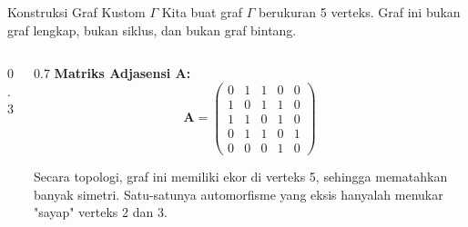 \documentclass[aspectratio=169]{beamer}
\begin{document}
\begin{frame}[fragile]{Konstruksi Graf Kustom $\Gamma$}
  Kita buat graf $\Gamma$ berukuran 5 verteks. Graf ini bukan graf lengkap, bukan siklus, dan bukan graf bintang.

  \begin{columns}
    \begin{column}{0.3\textwidth}
    \end{column}

    \begin{column}{0.7\textwidth}
      \small
      \textbf{Matriks Adjasensi $\mathbf{A}$:}
      $$ \mathbf{A} = \begin{pmatrix}
          0 & 1 & 1 & 0 & 0 \\
          1 & 0 & 1 & 1 & 0 \\
          1 & 1 & 0 & 1 & 0 \\
          0 & 1 & 1 & 0 & 1 \\
          0 & 0 & 0 & 1 & 0
        \end{pmatrix} $$

      Secara topologi, graf ini memiliki ekor di verteks 5, sehingga mematahkan banyak simetri. Satu-satunya automorfisme yang eksis hanyalah menukar "sayap" verteks 2 dan 3.
    \end{column}
  \end{columns}
\end{frame}
\end{document}
